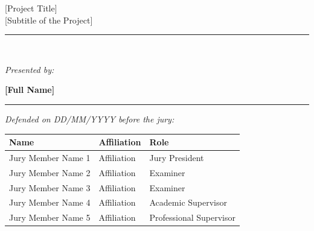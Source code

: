 \begin{center}
    \vspace{0.3cm}

    \begin{center}
        \begin{tcolorbox}[
            enhanced,
            colback=white,
            colframe=black!80,
            arc=3mm,
            boxrule=1pt,
            width=0.85\textwidth,
            halign=center,
            valign=center,
            fontupper=\fontsize{20}{24}\selectfont\bfseries,
            drop shadow,
            top=8pt,
            bottom=8pt,
            left=10pt,
            right=10pt
        ]
        \textcolor{black!90}{[Project Title]\\}
        \vspace{2pt}
        \fontsize{16}{20}\selectfont\textcolor{black!80}{[Subtitle of the Project]}
        \end{tcolorbox}
    \end{center}

    \vspace{0.2cm}

    \rule{0.5\textwidth}{1pt}\\[0.1cm]
    {\large\itshape{Presented by:}\/\par}
    \vspace{0.1cm}
    {\Large\bfseries [Full Name]\par}
    \rule{0.5\textwidth}{1pt}
    
    \vspace{0.7cm}
    
    {\large\itshape{Defended on DD/MM/YYYY before the jury:}\/\par}
    \vspace{0.2cm}
    \noindent
    \begin{tabularx}{\textwidth}{>{\raggedright\arraybackslash}X>{\raggedright\arraybackslash}X>{\raggedleft\arraybackslash}l}
        \toprule
        \textbf{Name} & \textbf{Affiliation} & \textbf{Role} \\
        \midrule
        Jury Member Name 1 & Affiliation & Jury President \\
        Jury Member Name 2 & Affiliation & Examiner \\
        Jury Member Name 3 & Affiliation & Examiner \\
        Jury Member Name 4 & Affiliation & Academic Supervisor \\
        Jury Member Name 5 & Affiliation & Professional Supervisor \\
        \bottomrule
    \end{tabularx}


\end{center}
